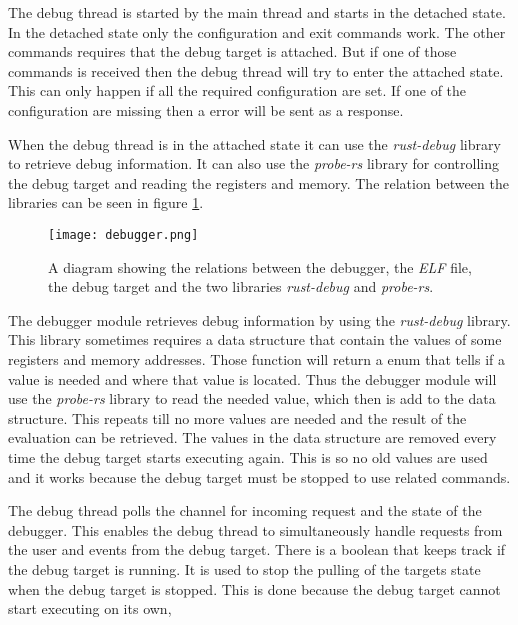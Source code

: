 The debug thread is started by the main thread and starts in the detached state.
In the detached state only the configuration and exit commands work.
The other commands requires that the debug target is attached.
But if one of those commands is received then the debug thread will try to enter the attached state.
This can only happen if all the required configuration are set.
If one of the configuration are missing then a error will be sent as a response.


When the debug thread is in the attached state it can use the \emph{rust-debug} library to retrieve debug information.
It can also use the \emph{probe-rs} library for controlling the debug target and reading the registers and memory.
The relation between the libraries can be seen in figure \ref{fig:debugger}.


\begin{figure}[h]
	\centering
	\texttt{[image: debugger.png]}
	\caption{A diagram showing the relations between the debugger, the \emph{ELF} file, the debug target and the two libraries \emph{rust-debug} and \emph{probe-rs}.}
	\label{fig:debugger}
\end{figure}


The debugger module retrieves debug information by using the \emph{rust-debug} library.
This library sometimes requires a data structure that contain the values of some registers and memory addresses.
Those function will return a enum that tells if a value is needed and where that value is located.
Thus the debugger module will use the \emph{probe-rs} library to read the needed value, which then is  add to the data structure.
This repeats till no more values are needed and the result of the evaluation can be retrieved.
The values in the data structure are removed every time the debug target starts executing again.
This is so no old values are used and it works because the debug target must be stopped to use related commands.



The debug thread polls the channel for incoming request and the state of the debugger.
This enables the debug thread to simultaneously handle requests from the user and events from the debug target.
There is a boolean that keeps track if the debug target is running.
It is used to stop the pulling of the targets state when the debug target is stopped.
This is done because the debug target cannot start executing on its own,


